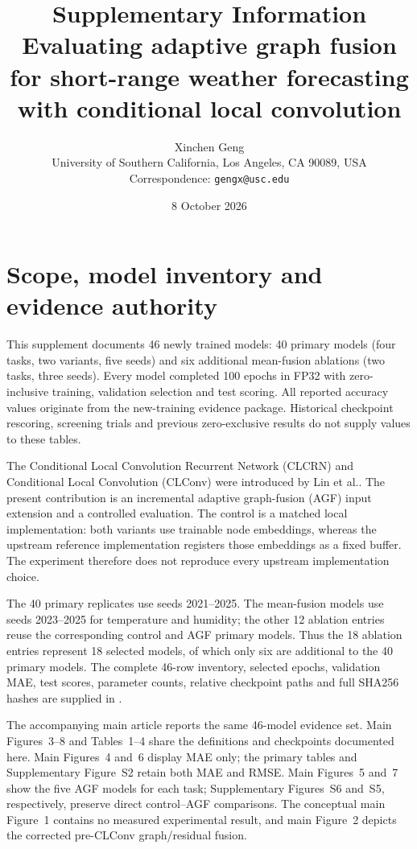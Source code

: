 \documentclass[10pt,a4paper]{article}
\title{\textbf{Supplementary Information}\\[0.5em]\large Evaluating adaptive graph fusion for short-range weather forecasting with conditional local convolution}
\author{Xinchen Geng\\\small University of Southern California, Los Angeles, CA 90089, USA\\\small Correspondence: \texttt{gengx@usc.edu}}
\date{8 October 2026}
\begin{document}
\maketitle
\section{Scope, model inventory and evidence authority}
This supplement documents 46 newly trained models: 40 primary models (four tasks, two variants, five seeds) and six additional mean-fusion ablations (two tasks, three seeds). Every model completed 100 epochs in FP32 with zero-inclusive training, validation selection and test scoring. All reported accuracy values originate from the new-training evidence package. Historical checkpoint rescoring, screening trials and previous zero-exclusive results do not supply values to these tables.

The Conditional Local Convolution Recurrent Network (CLCRN) and Conditional Local Convolution (CLConv) were introduced by Lin et al.\cite{lin2022conditional}. The present contribution is an incremental adaptive graph-fusion (AGF) input extension and a controlled evaluation. The control is a matched local implementation: both variants use trainable node embeddings, whereas the upstream reference implementation registers those embeddings as a fixed buffer. The experiment therefore does not reproduce every upstream implementation choice.

The 40 primary replicates use seeds 2021--2025. The mean-fusion models use seeds 2023--2025 for temperature and humidity; the other 12 ablation entries reuse the corresponding control and AGF primary models. Thus the 18 ablation entries represent 18 selected models, of which only six are additional to the 40 primary models. The complete 46-row inventory, selected epochs, validation MAE, test scores, parameter counts, relative checkpoint paths and full SHA256 hashes are supplied in .

The accompanying main article reports the same 46-model evidence set. Main Figures~3--8 and Tables~1--4 share the definitions and checkpoints documented here. Main Figures~4 and~6 display MAE only; the primary tables and Supplementary Figure~S2 retain both MAE and RMSE. Main Figures~5 and~7 show the five AGF models for each task; Supplementary Figures~S6 and~S5, respectively, preserve direct control--AGF comparisons. The conceptual main Figure~1 contains no measured experimental result, and main Figure~2 depicts the corrected pre-CLConv graph/residual fusion.
\end{document}
